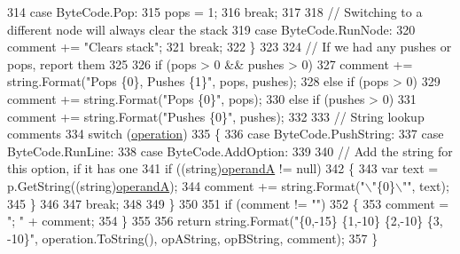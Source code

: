 \begin{DoxyCode}
314                 \textcolor{keywordflow}{case} ByteCode.Pop:
315                     pops = 1;
316                     \textcolor{keywordflow}{break};
317 
318                 \textcolor{comment}{// Switching to a different node will always clear the stack}
319                 \textcolor{keywordflow}{case} ByteCode.RunNode:
320                     comment += \textcolor{stringliteral}{"Clears stack"};
321                     \textcolor{keywordflow}{break};
322             \}
323 
324             \textcolor{comment}{// If we had any pushes or pops, report them}
325 
326             \textcolor{keywordflow}{if} (pops > 0 && pushes > 0)
327                 comment += string.Format(\textcolor{stringliteral}{"Pops \{0\}, Pushes \{1\}"}, pops, pushes);
328             \textcolor{keywordflow}{else} \textcolor{keywordflow}{if} (pops > 0)
329                 comment += string.Format(\textcolor{stringliteral}{"Pops \{0\}"}, pops);
330             \textcolor{keywordflow}{else} \textcolor{keywordflow}{if} (pushes > 0)
331                 comment += string.Format(\textcolor{stringliteral}{"Pushes \{0\}"}, pushes);
332 
333             \textcolor{comment}{// String lookup comments}
334             \textcolor{keywordflow}{switch} (\hyperlink{a00113_a566bf5f7198cc353ea5c3710cb3a31cb}{operation})
335             \{
336                 \textcolor{keywordflow}{case} ByteCode.PushString:
337                 \textcolor{keywordflow}{case} ByteCode.RunLine:
338                 \textcolor{keywordflow}{case} ByteCode.AddOption:
339 
340                     \textcolor{comment}{// Add the string for this option, if it has one}
341                     \textcolor{keywordflow}{if} ((\textcolor{keywordtype}{string})\hyperlink{a00113_ab5d386faa0d3dbc23db80f8e62706afd}{operandA} != null)
342                     \{
343                         var text = p.GetString((string)\hyperlink{a00113_ab5d386faa0d3dbc23db80f8e62706afd}{operandA});
344                         comment += string.Format(\textcolor{stringliteral}{"\(\backslash\)"\{0\}\(\backslash\)""}, text);
345                     \}
346 
347                     \textcolor{keywordflow}{break};
348 
349             \}
350 
351             \textcolor{keywordflow}{if} (comment != \textcolor{stringliteral}{""})
352             \{
353                 comment = \textcolor{stringliteral}{"; "} + comment;
354             \}
355 
356             \textcolor{keywordflow}{return} string.Format(\textcolor{stringliteral}{"\{0,-15\} \{1,-10\} \{2,-10\} \{3, -10\}"}, operation.ToString(), opAString, 
      opBString, comment);
357         \}
\end{DoxyCode}


